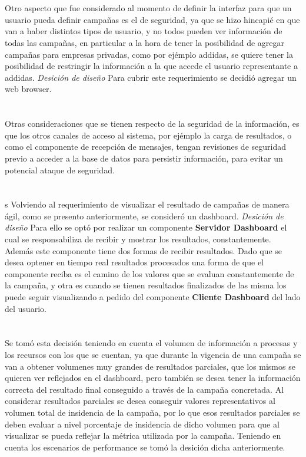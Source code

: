 \documentclass[a4paper, 11pt]{article}
\begin{document}
\\
\\
Otro aspecto que fue considerado al momento de definir la interfaz para que un usuario pueda definir campañas es el de seguridad, ya que se hizo hincapié en que van a haber distintos tipos de usuario, y no todos pueden ver información de todas las campañas, en particular a la hora de tener la posibilidad de agregar campañas para empresas privadas, como por ejémplo addidas, se quiere tener la posibilidad de restringir la información a la que accede el usuario representante a addidas.
\emph{Desición de diseño} Para cubrir este requerimiento se decidió agregar un web browser. \\
\\
\\
Otras consideraciones que se tienen respecto de la seguridad de la información, es que los otros canales de acceso al sistema, por ejémplo la carga de resultados, o como el componente de recepción de mensajes, tengan revisiones de seguridad previo a acceder a la base de datos para persistir información, para evitar un potencial ataque de seguridad.\\
\\
\\s
Volviendo al requerimiento de visualizar el resultado de campañas de manera ágil, como se presento anteriormente, se consideró un dashboard.
\emph{Desición de diseño} Para ello se optó por realizar un componente \textbf{Servidor Dashboard} el cual se responsabiliza de recibir y mostrar los resultados, constantemente. Además este componente tiene dos formas de recibir resultados. Dado que se desea optener en tiempo real resultados procesados una forma de que el componente reciba es el camino de los valores que se evaluan constantemente de la campaña, y otra es cuando se tienen resultados finalizados de las misma los puede seguir visualizando a pedido del componente \textbf{Cliente Dashboard} del lado del usuario.\\
\\
\\
Se tomó esta decisión teniendo en cuenta el volumen de información a procesas y los recursos con los que se cuentan, ya que durante la vigencia de una campaña se van a obtener volumenes muy grandes de resultados parciales,  que los mismos se quieren ver reflejados en el dashboard, pero también se desea tener la información correcta del resultado final conseguido a través de la campaña concretada. Al considerar resultados parciales se desea conseguir valores representativos al volumen total de insidencia de la campaña, por lo que esos resultados parciales se deben evaluar a nivel porcentaje de insidencia de dicho volumen para que al visualizar se pueda reflejar la métrica utilizada por la campaña.
Teniendo en cuenta los escenarios de performance se tomó la desición dicha anteriormente.
\end{document}
